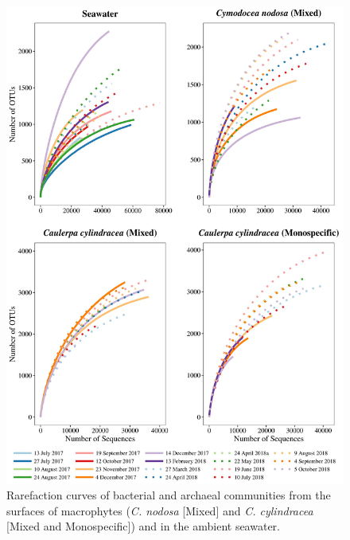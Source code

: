 \documentclass[12pt,]{article}
\begin{document}
\begin{figure}[H]

{\centering \includegraphics[width=0.85\linewidth]{../results/figures/rarefaction} 

}

\caption{Rarefaction curves of bacterial and archaeal communities from the surfaces of macrophytes (\textit{C. nodosa} [Mixed] and \textit{C. cylindracea} [Mixed and Monospecific]) and in the ambient seawater.\label{rarefaction}}\label{fig:unnamed-chunk-1}
\end{figure}
\end{document}
